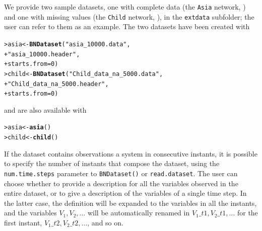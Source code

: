 \documentclass{article}\usepackage[]{graphicx}\usepackage[]{color}
\makeatletter
\newcommand{\hlnum}[1]{\textcolor[rgb]{0.686,0.059,0.569}{#1}}%
\newcommand{\hlstr}[1]{\textcolor[rgb]{0.192,0.494,0.8}{#1}}%
\newcommand{\hlstd}[1]{\textcolor[rgb]{0.345,0.345,0.345}{#1}}%
\newcommand{\hlkwb}[1]{\textcolor[rgb]{0.69,0.353,0.396}{#1}}%
\newcommand{\hlkwc}[1]{\textcolor[rgb]{0.333,0.667,0.333}{#1}}%
\newcommand{\hlkwd}[1]{\textcolor[rgb]{0.737,0.353,0.396}{\textbf{#1}}}%
\newenvironment{kframe}{%
 \def\at@end@of@kframe{}%
 \ifinner\ifhmode%
  \def\at@end@of@kframe{\end{minipage}}%
  \begin{minipage}{\columnwidth}%
 \fi\fi%
 \def\FrameCommand##1{\hskip\@totalleftmargin \hskip-\fboxsep
 \colorbox{shadecolor}{##1}\hskip-\fboxsep
     \hskip-\linewidth \hskip-\@totalleftmargin \hskip\columnwidth}%
 \MakeFramed {\advance\hsize-\width
   \@totalleftmargin\z@ \linewidth\hsize
   \@setminipage}}%
 {\par\unskip\endMakeFramed%
 \at@end@of@kframe}
\newenvironment{knitrout}{}{} %
\makeatother
\begin{document}
We provide two sample datasets, one with complete data (the \texttt{Asia} network, \citet*{lauritzen1988local}) and one with missing values
(the \texttt{Child} network, \citet*{spiegelhalter1993bayesian}), in the \texttt{extdata} subfolder;
the user can refer to them as an example. The two datasets have been created with

\begin{knitrout}
\color{fgcolor}\begin{kframe}
\begin{alltt}
\hlstd{> }\hlstd{asia} \hlkwb{<-} \hlkwd{BNDataset}\hlstd{(}\hlstr{"asia_10000.data"}\hlstd{,}
\hlstd{+ }                  \hlstr{"asia_10000.header"}\hlstd{,}
\hlstd{+ }                  \hlkwc{starts.from} \hlstd{=} \hlnum{0}\hlstd{)}
\hlstd{> }\hlstd{child} \hlkwb{<-} \hlkwd{BNDataset}\hlstd{(}\hlstr{"Child_data_na_5000.data"}\hlstd{,}
\hlstd{+ }                   \hlstr{"Child_data_na_5000.header"}\hlstd{,}
\hlstd{+ }                   \hlkwc{starts.from} \hlstd{=} \hlnum{0}\hlstd{)}
\end{alltt}
\end{kframe}
\end{knitrout}

and are also available with

\begin{knitrout}
\color{fgcolor}\begin{kframe}
\begin{alltt}
\hlstd{> }\hlstd{asia}  \hlkwb{<-} \hlkwd{asia}\hlstd{()}
\hlstd{> }\hlstd{child} \hlkwb{<-} \hlkwd{child}\hlstd{()}
\end{alltt}
\end{kframe}
\end{knitrout}

If the dataset contains observations a system in consecutive instants,
it is possible to specify the number of instants that compose the dataset,
using the \texttt{num.time.steps} parameter to \texttt{BNDataset()} or \texttt{read.dataset}.
The user can choose whether to provide a description for all the variables observed in the 
entire dataset, or to give a description of the variables of a single time step.
In the latter case, the definition will be expanded to the variables in all the instants,
and the variables $V_1, V_2, \dots$ will be automatically renamed in $V_1\_t1, V_2\_t1, \dots$
for the first instant, $V_1\_t2, V_2\_t2, \dots$, and so on.
\end{document}

